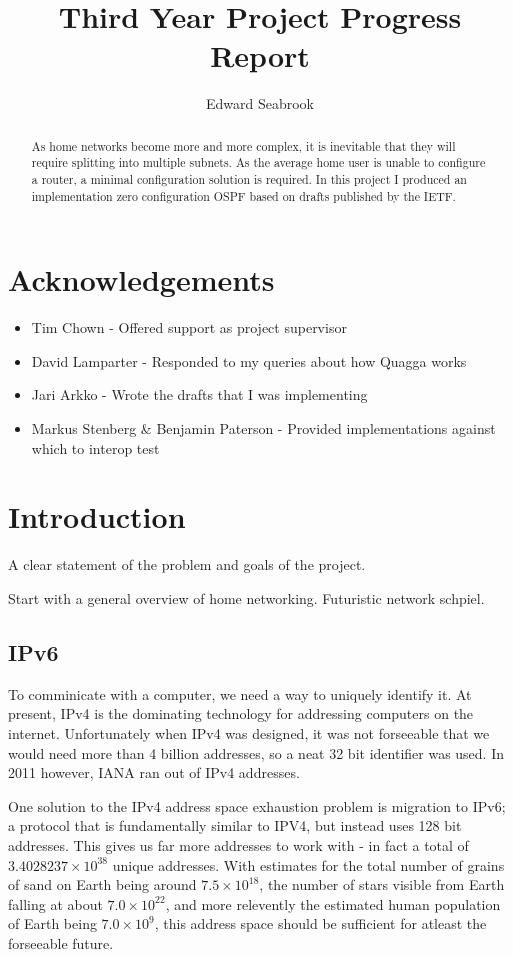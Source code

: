 \documentclass[12pt]{report}
\author{Edward Seabrook}
\title{Third Year Project Progress Report}
\begin{document}


\begin{abstract}
As home networks become more and more complex, it is inevitable that they will
require splitting into multiple subnets. As the average home user is unable to
configure a router, a minimal configuration solution is required. In this
project I produced an implementation zero configuration OSPF based on drafts
published by the IETF. 
\end{abstract}

\tableofcontents
\clearpage

\chapter{Acknowledgements}

\begin{itemize}
\item Tim Chown - Offered support as project supervisor
\item David Lamparter - Responded to my queries about how Quagga works
\item Jari Arkko - Wrote the drafts that I was implementing

\item Markus Stenberg \& Benjamin Paterson - Provided implementations against which to interop test
\end{itemize}

\chapter{Introduction}
A clear statement of the problem and goals of the project.

Start with a general overview of home networking. Futuristic network schpiel.

\section{IPv6}
To comminicate with a computer, we need a way to uniquely identify it. At
present, IPv4 is the dominating technology for addressing computers on the
internet. Unfortunately when IPv4 was designed, it was not forseeable that we
would need more than 4 billion addresses, so a neat 32 bit identifier was used.
In 2011 however, IANA ran out of IPv4 addresses. 

One solution to the IPv4 address space exhaustion problem is migration to
IPv6; a protocol that is fundamentally similar to IPV4, but instead uses 128
bit addresses. This gives us far more addresses to work with - in fact a total
of $3.4028237\times10^{38}$ unique addresses. With estimates for the total
number of grains of sand on Earth being around $7.5\times10^{18}$, the number
of stars visible from Earth falling at about $7.0\times10^{22}$, and more
relevently the estimated human population of Earth being $7.0\times10^{9}$,
this address space should be sufficient for atleast the forseeable future. 
\end{document}
